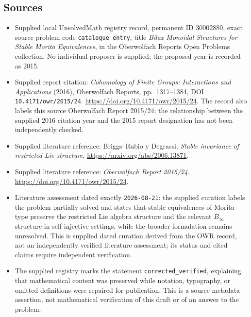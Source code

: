 \documentclass[11pt]{article}
\begin{document}
\subsection{Sources}
\begin{itemize}
\item Supplied local UnsolvedMath registry record, permanent ID \(30002880\), exact source problem code \texttt{catalogue entry}, title \emph{Bilax Monoidal Structures for Stable Morita Equivalences}, in the Oberwolfach Reports Open Problems collection. No individual proposer is supplied; the proposed year is recorded as 2015.
\item Supplied report citation: \emph{Cohomology of Finite Groups: Interactions and Applications} (2016), Oberwolfach Reports, pp.\ 1317--1384, DOI \texttt{10.4171/owr/2015/24}. \url{https://doi.org/10.4171/owr/2015/24}. The record also labels this source Oberwolfach Report 2015/24; the relationship between the supplied 2016 citation year and the 2015 report designation has not been independently checked.
\item Supplied literature reference: Briggs--Rubio y Degrassi, \emph{Stable invariance of restricted Lie structure}. \url{https://arxiv.org/abs/2006.13871}.
\item Supplied literature reference: \emph{Oberwolfach Report 2015/24}. \url{https://doi.org/10.4171/owr/2015/24}.
\item Literature assessment dated exactly \texttt{2026-08-21}: the supplied curation labels the problem partially solved and states that stable equivalences of Morita type preserve the restricted Lie algebra structure and the relevant \(B_\infty\) structure in self-injective settings, while the broader formulation remains unresolved. This is supplied dated curation derived from the OWR record, not an independently verified literature assessment; its status and cited claims require independent verification.
\item The supplied registry marks the statement \texttt{corrected\_verified}, explaining that mathematical content was preserved while notation, typography, or omitted definitions were repaired for publication. This is a source metadata assertion, not mathematical verification of this draft or of an answer to the problem.
\end{itemize}
\end{document}
